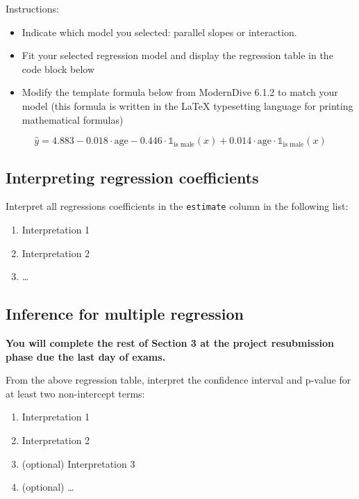 \documentclass[
]{article}
\providecommand{\tightlist}{%
  \setlength{\itemsep}{0pt}\setlength{\parskip}{0pt}}
\begin{document}
Instructions:

\begin{itemize}
\tightlist
\item
  Indicate which model you selected: parallel slopes or interaction.
\item
  Fit your selected regression model and display the regression table in
  the code block below
\item
  Modify the template formula below from ModernDive 6.1.2 to match your
  model (this formula is written in the LaTeX typesetting language for
  printing mathematical formulas)
\end{itemize}

\[
\widehat{y} = 
4.883 
- 0.018 \cdot \text{age}  
- 0.446 \cdot \mathbb{1}_{\text{is male}}(x)
+ 0.014 \cdot \text{age} \cdot \mathbb{1}_{\text{is male}}(x)
\]

\hypertarget{interpreting-regression-coefficients}{%
\subsection{Interpreting regression
coefficients}\label{interpreting-regression-coefficients}}

Interpret all regressions coefficients in the \texttt{estimate} column
in the following list:

\begin{enumerate}
\def\labelenumi{\arabic{enumi}.}
\tightlist
\item
  Interpretation 1
\item
  Interpretation 2
\item
  \ldots{}
\end{enumerate}

\hypertarget{inference-for-multiple-regression}{%
\subsection{Inference for multiple
regression}\label{inference-for-multiple-regression}}

\textbf{You will complete the rest of Section 3 at the project
resubmission phase due the last day of exams.}

From the above regression table, interpret the confidence interval and
p-value for at least two non-intercept terms:

\begin{enumerate}
\def\labelenumi{\arabic{enumi}.}
\tightlist
\item
  Interpretation 1
\item
  Interpretation 2
\item
  (optional) Interpretation 3
\item
  (optional) \ldots{}
\end{enumerate}
\end{document}
